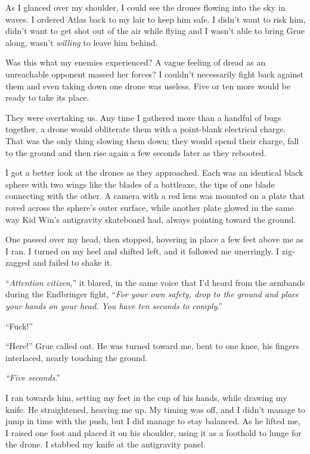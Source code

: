 As I glanced over my shoulder, I could see the drones flowing into the sky in waves.  I ordered Atlas back to my lair to keep him safe.  I didn't want to risk him, didn't want to get shot out of the air while flying and I wasn't able to bring Grue along, wasn't \emph{willing }to leave him behind.



Was this what my enemies experienced?  A vague feeling of dread as an unreachable opponent massed her forces?  I couldn't necessarily fight back against them and even taking down one drone was useless.  Five or ten more would be ready to take its place.



They were overtaking us.  Any time I gathered more than a handful of bugs together, a drone would obliterate them with a point-blank electrical charge.  That was the only thing slowing them down; they would spend their charge, fall to the ground and then rise again a few seconds later as they rebooted.



I got a better look at the drones as they approached.  Each was an identical black sphere with two wings like the blades of a battleaxe, the tips of one blade connecting with the other.  A camera with a red lens was mounted on a plate that roved across the sphere's outer surface, while another plate glowed in the same way Kid Win's antigravity skateboard had, always pointing toward the ground.



One passed over my head, then stopped, hovering in place a few feet above me as I ran.  I turned on my heel and shifted left, and it followed me unerringly.  I zig-zagged and failed to shake it.



``\emph{Attention citizen},'' it blared, in the same voice that I'd heard from the armbands during the Endbringer fight, ``\emph{For your own safety, drop to the ground and place your hands on your head.  You have ten seconds to comply}.''



``Fuck!''



``Here!''  Grue called out.  He was turned toward me, bent to one knee, his fingers interlaced, nearly touching the ground.



\emph{``Five seconds}.''



I ran towards him, setting my feet in the cup of his hands, while drawing my knife.  He straightened, heaving me up.  My timing was off, and I didn't manage to jump in time with the push, but I did manage to stay balanced.  As he lifted me, I raised one foot and placed it on his shoulder, using it as a foothold to lunge for the drone.  I stabbed my knife at the antigravity panel.




